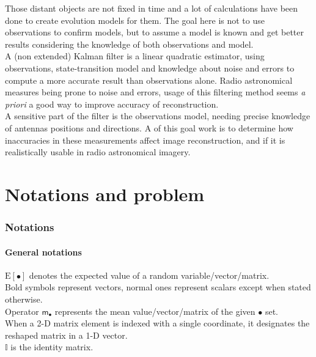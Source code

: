 \documentclass[titlepage]{article}
\newcommand{\moy}[1]{\boldsymbol{\mathsf{m}}_{#1}}
\renewcommand{\expval}[1]{\text{E}\left[#1\right]}
\begin{document}
	Those distant objects are not fixed in time and a lot of calculations have been done to create evolution models for them. The goal here is not to use observations to confirm models, but to assume a model is known and get better results considering the knowledge of both observations and model. \\ 
	
	A (non extended) Kalman filter is a linear quadratic estimator, using observations, state-transition model and knowledge about noise and errors to compute a more accurate result than observations alone. Radio astronomical measures being prone to noise and errors, usage of this filtering method seems \emph{a priori} a good way to improve accuracy of reconstruction. \\
		
	A sensitive part of the filter is the observations model, needing precise knowledge of antennas positions and directions. A of this goal work is to determine how inaccuracies in these measurements affect image reconstruction, and if it is realistically usable in radio astronomical imagery. \\
	
	\newpage
	\part{Notations and problem}
	\section{Notations}
	
	\subsection{General notations}
	
	$\expval{\bullet}$ denotes the expected value of a random variable/vector/matrix.\\
	
	Bold symbols represent vectors, normal ones represent scalars except when stated otherwise.\\
	
	Operator $\moy{\bullet}$ represents the mean value/vector/matrix of the given $\bullet$ set.\\
	
	When a 2-D matrix element is indexed with a single coordinate, it designates the reshaped matrix in a 1-D vector.\\
	
	$\mathbb{I}$ is the identity matrix.
	
\end{document}
